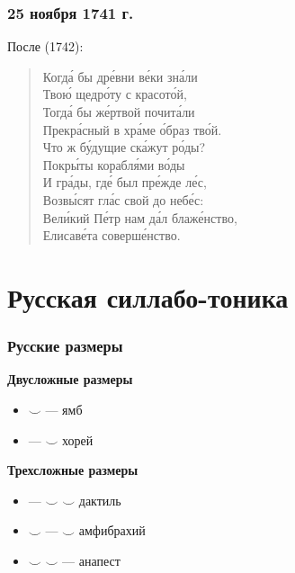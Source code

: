 \documentclass{beamer}
\begin{document}
\begin{frame}
\frametitle{25 ноября 1741 г.}
После (1742):

\begin{verse}
Когд\'{а} бы др\'{е}вни в\'{е}ки зн\'{а}ли\\
Тво\'{ю} щедр\'{о}ту с кр\alert{а}сот\'{о}й,\\
Тогд\'{а} бы ж\'{е}ртвой п\alert{о}чит\'{а}ли\\
Прекр\'{а}сный в хр\'{а}ме \'{о}браз тв\'{о}й.\\
Что ж б\'{у}дущ\alert{и}е ск\'{а}жут р\'{о}ды?\\
Покр\'{ы}ты к\alert{о}рабл\'{я}ми в\'{о}ды\\
И гр\'{а}ды, гд\'{е} был пр\'{е}жде л\'{е}с,\\
Возв\'{ы}сят гл\'{а}с свой д\alert{о} неб\'{е}с:\\
Вел\'{и}кий П\'{е}тр нам д\'{а}л блаж\'{е}нство,\\
Ел\alert{и}сав\'{е}та с\alert{о}верш\'{е}нство.
\end{verse}
\end{frame}


\section{Русская силлабо-тоника}\label{sec:rusyl}

\begin{frame}
\frametitle{Русские размеры}
\begin{center}
\textbf{Двусложные размеры}
\end{center}

\begin{itemize}
\item  $\smile$ --- ямб
\item  --- $\smile$ хорей
\end{itemize}

\begin{center}
\textbf{Трехсложные размеры}
\end{center}

\begin{itemize}
\item  --- $\smile$ $\smile$ дактиль
\item  $\smile$ --- $\smile$ амфибрахий
\item  $\smile$ $\smile$ --- анапест
\end{itemize}

\end{frame}
\end{document}

